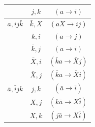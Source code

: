 \documentclass[./thesis.tex]{subfiles}
\begin{document}
\begin{table}
\begin{tabular}{ c|c|c }
		                                                                                                   & $j,k$                                                                                        & $(a\rightarrow i)$                                              \\
		\hline
		\rule{0pt}{3ex} $a,ij \bar k$                                                                                      & $\bar k,X$                                                                                   & $(aX\rightarrow ij)$                                            \\
		                                                                                                   & $\bar k,i$                                                                                   & $(a\rightarrow j)$                                              \\
		                                                                                                   & $\bar k,j$                                                                                   & $(a\rightarrow i)$                                              \\
		                                                                                                   & $\bar X,i$                                                                                   & $(\bar ka  \rightarrow \bar X j)$                               \\
		                                                                                                   & $\bar X,j$                                                                                   & $(\bar ka  \rightarrow \bar X i)$                               \\
		\hline
		\rule{0pt}{3ex} $\bar a,\bar i j k$                                                                                & $j,k$                                                                                        & $(\bar a\rightarrow \bar i)$                                    \\
		                                                                                                   & $X,j$                                                                                        & $(k\bar a\rightarrow X\bar i)$                                  \\
		                                                                                                   & $X,k$                                                                                        & $(j\bar a\rightarrow X\bar i)$                                  \\
		                 

\end{tabular}
\end{table}
\end{document}
